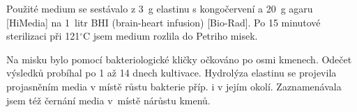 Použité medium se sestávalo z 3~g elastinu s kongočervení a 20~g agaru [HiMedia] na 1~litr BHI (brain-heart infusion) [Bio-Rad].
Po 15 minutové sterilizaci při 121$^{\circ}$C jsem medium rozlila do Petriho misek.

Na misku bylo pomocí bakteriologické kličky očkováno po osmi kmenech.
Odečet výsledků probíhal po 1 až 14 dnech kultivace.
Hydrolýza elastinu se projevila projasněním media v místě růstu bakterie příp. i v jejím okolí.
Zaznamenávala jsem též černání media v~místě nárůstu kmenů.

\shorthandon{-} 
